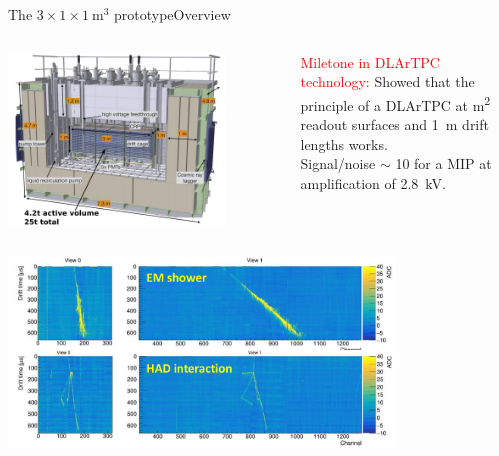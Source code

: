 \documentclass[10pt]{beamer}
\begin{document}
	\begin{frame}{The \texorpdfstring{$3 \times 1 \times \SI{1}{\meter\cubed}$}{311} prototype}{Overview}
		\begin{columns}
			\begin{column}{0.48\textwidth}
				\centering
				\includegraphics[width=0.8\textwidth]{figures/311/311_2.png}
			\end{column}\hfill
			\begin{column}{0.48\textwidth}
				\begin{scriptsize}
					\textcolor{red}{Miletone in DLArTPC technology:} Showed that the principle of a DLArTPC at \si{\meter\squared} readout surfaces and \SI{1}{\meter} drift lengths works.\\
					Signal/noise $\sim$ 10 for a MIP at amplification of \SI{2.8}{\kilo\volt}.
				\end{scriptsize}
			\end{column}\hfill
		\end{columns}
		\centering
		\includegraphics[width=0.77\textwidth]{figures/311/events.png}\\
	\end{frame}
	    
\end{document}
